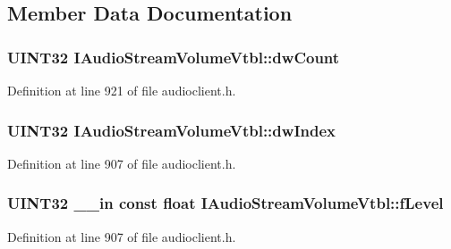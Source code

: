 \subsection{Member Data Documentation}
\subsubsection[{\texorpdfstring{dw\+Count}{dwCount}}]{ U\+I\+N\+T32 I\+Audio\+Stream\+Volume\+Vtbl\+::dw\+Count}\hypertarget{struct_i_audio_stream_volume_vtbl_af2354bd92fa75d7c292aac1170bd8845}{}\label{struct_i_audio_stream_volume_vtbl_af2354bd92fa75d7c292aac1170bd8845}


Definition at line 921 of file audioclient.\+h.

\subsubsection[{\texorpdfstring{dw\+Index}{dwIndex}}]{ U\+I\+N\+T32 I\+Audio\+Stream\+Volume\+Vtbl\+::dw\+Index}\hypertarget{struct_i_audio_stream_volume_vtbl_a26ffc54bae06fbae053a243667cf7615}{}\label{struct_i_audio_stream_volume_vtbl_a26ffc54bae06fbae053a243667cf7615}


Definition at line 907 of file audioclient.\+h.

\subsubsection[{\texorpdfstring{f\+Level}{fLevel}}]{ U\+I\+N\+T32 {\bf \+\_\+\+\_\+in} {\bf const} float I\+Audio\+Stream\+Volume\+Vtbl\+::f\+Level}\hypertarget{struct_i_audio_stream_volume_vtbl_a214cca90cdceed4f5f2e2b9e2b601110}{}\label{struct_i_audio_stream_volume_vtbl_a214cca90cdceed4f5f2e2b9e2b601110}


Definition at line 907 of file audioclient.\+h.

